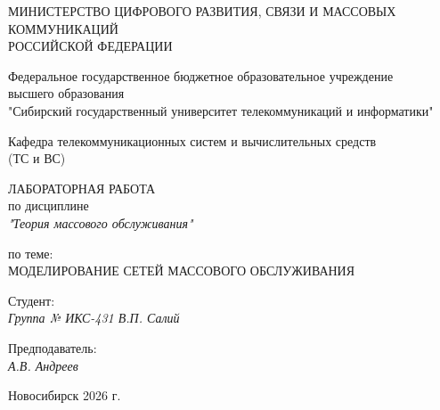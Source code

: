 
\thispagestyle{empty}

\begin{center}
    МИНИСТЕРСТВО ЦИФРОВОГО РАЗВИТИЯ, СВЯЗИ И МАССОВЫХ КОММУНИКАЦИЙ \\ РОССИЙСКОЙ ФЕДЕРАЦИИ

    \vspace{20pt}

    Федеральное государственное бюджетное образовательное учреждение  \\  высшего образования \\
    "Сибирский государственный университет телекоммуникаций и информатики" \\

    \vspace{20pt}

    Кафедра телекоммуникационных систем и вычислительных средств\\  (ТС и ВС)
\end{center}

\vfill

\begin{center}
    ЛАБОРАТОРНАЯ РАБОТА \\
    по дисциплине \\
    \textit{"Теория массового обслуживания"}

    \vspace{20pt}

    по теме: \\
    \uppercase{Моделирование сетей массового обслуживания}
\end{center}

\vfill

    \noindent Студент: \\
    \textit{Группа № ИКС-431 \hfill В.П. Салий}

    \vspace{20pt}

    \noindent Предподаватель: \\
    \textit{А.В. Андреев}

\vfill

\begin{center}
    Новосибирск 2026 г.
\end{center}
